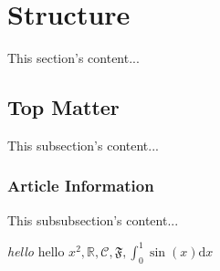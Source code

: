 \documentclass{article}
\begin{document}
\author{Someone}
\maketitle


\section{Structure}
This section's content...

\subsection{Top Matter}
This subsection's content...

\subsubsection{Article Information}
This subsubsection's content...

\emph{hello} hello $x^2, \mathbb R, \mathcal C, \mathfrak F, \int_0^1 \sin(x) \mathrm d x$
\end{document}

